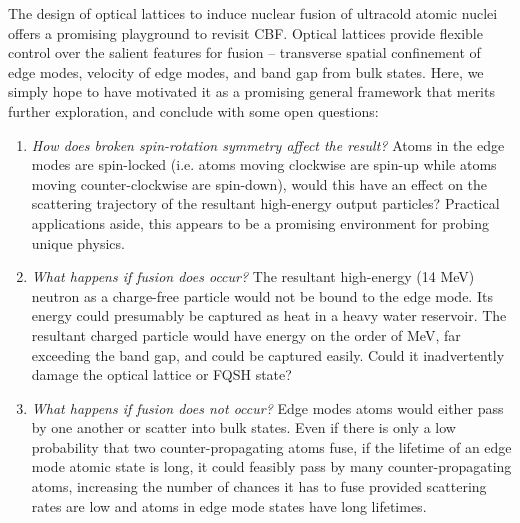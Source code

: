 \documentclass[onecolumn,
               superscriptaddress,
               floatfix,
               longbibliography, 
               showkeys,apl]{revtex4-2}
\begin{document}
The design of optical lattices to induce nuclear fusion of ultracold atomic nuclei offers a promising playground to revisit CBF. Optical lattices provide flexible control over the salient features for fusion -- transverse spatial confinement of edge modes, velocity of edge modes, and band gap from bulk states. Here, we simply hope to have motivated it as a promising general framework that merits further exploration, and conclude with some open questions:

\begin{enumerate}
\item \textit{How does broken spin-rotation symmetry affect the result?} Atoms in the edge modes are spin-locked (i.e. atoms moving clockwise are spin-up while atoms moving counter-clockwise are spin-down), would this have an effect on the scattering trajectory of the resultant high-energy output particles? Practical applications aside, this appears to be a promising environment for probing unique physics.
\item \textit{What happens if fusion does occur?} The resultant high-energy (14 MeV) neutron as a charge-free particle would not be bound to the edge mode. Its energy could presumably be captured as heat in a heavy water reservoir. The resultant charged particle would have energy on the order of MeV, far exceeding the band gap, and could be captured easily. Could it inadvertently damage the optical lattice or FQSH state? 
\item \textit {What happens if fusion does not occur?} Edge modes atoms would either pass by one another or scatter into bulk states. Even if there is only a low probability that two counter-propagating atoms fuse, if the lifetime of an edge mode atomic state is long, it could feasibly pass by many counter-propagating atoms, increasing the number of chances it has to fuse provided scattering rates are low and atoms in edge mode states have long lifetimes.
\end{enumerate}




\pagebreak
\end{document}
